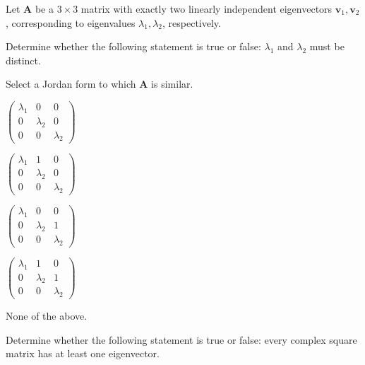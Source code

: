 \documentclass[11pt,oneside]{article}
\begin{document}
\begin{problem}
Let $\mathbf A$ be a $3\times3$ matrix with exactly two linearly independent eigenvectors $\mathbf v_1,\mathbf v_2$, corresponding to eigenvalues $\lambda_1,\lambda_2$, respectively.
\begin{problemsubparts}
\item Determine whether the following statement is true or false: $\lambda_1$ and $\lambda_2$ must be distinct.
\item Select a Jordan form to which $\mathbf A$ is similar.
\begin{problemchoices}
\item $\displaystyle\begin{pmatrix}\lambda_1&0&0\\0&\lambda_2&0\\0&0&\lambda_2\end{pmatrix}$
\item $\displaystyle\begin{pmatrix}\lambda_1&1&0\\0&\lambda_2&0\\0&0&\lambda_2\end{pmatrix}$
\item $\displaystyle\begin{pmatrix}\lambda_1&0&0\\0&\lambda_2&1\\0&0&\lambda_2\end{pmatrix}$
\item $\displaystyle\begin{pmatrix}\lambda_1&1&0\\0&\lambda_2&1\\0&0&\lambda_2\end{pmatrix}$
\item None of the above.
\end{problemchoices}
\end{problemsubparts}
\end{problem}

\begin{problem}
Determine whether the following statement is true or false: every complex square matrix has at least one eigenvector.
\end{problem}
\end{document}
